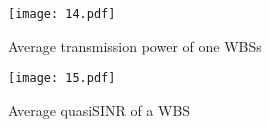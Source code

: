 \begin{figure}[h!]
  \centering
  \texttt{[image: 14.pdf]}
  \caption{Average transmission power of one WBSs}
\label{CAPA_power}
\end{figure}


\begin{figure}[h!]
  \centering
  \texttt{[image: 15.pdf]}
  \caption{Average quasiSINR of a WBS}
\label{CAPA_quasiSINR}
\end{figure}








